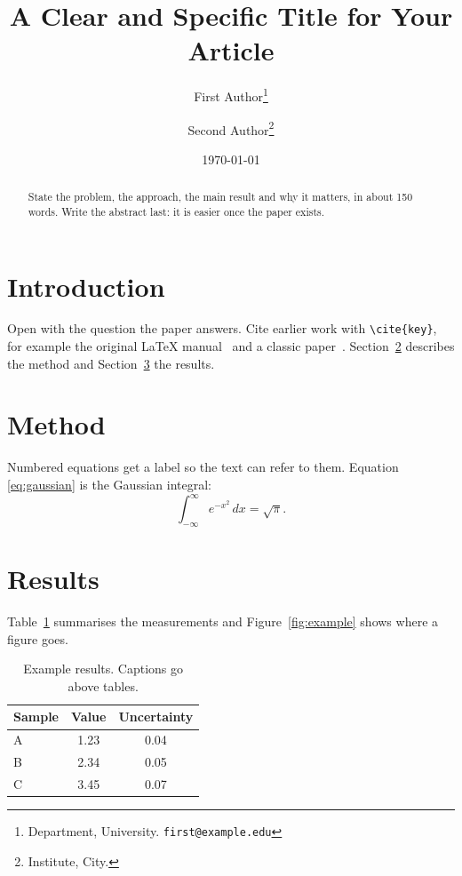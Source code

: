 \documentclass[11pt,a4paper]{article}
\title{A Clear and Specific Title for Your Article}
\author{First Author\thanks{Department, University. \texttt{first@example.edu}}
  \and Second Author\thanks{Institute, City.}}
\date{\today}
\begin{document}
\maketitle

\begin{abstract}
State the problem, the approach, the main result and why it matters, in
about 150 words. Write the abstract last: it is easier once the paper exists.
\end{abstract}

\section{Introduction}
\label{sec:intro}

Open with the question the paper answers. Cite earlier work with
\verb|\cite{key}|, for example the original \LaTeX{} manual~\cite{lamport1994}
and a classic paper~\cite{einstein1905}. Section~\ref{sec:method} describes
the method and Section~\ref{sec:results} the results.

\section{Method}
\label{sec:method}

Numbered equations get a label so the text can refer to them. Equation
\eqref{eq:gaussian} is the Gaussian integral:
\begin{equation}
  \int_{-\infty}^{\infty} e^{-x^{2}}\,dx = \sqrt{\pi}.
  \label{eq:gaussian}
\end{equation}

\section{Results}
\label{sec:results}

Table~\ref{tab:results} summarises the measurements and
Figure~\ref{fig:example} shows where a figure goes.

\begin{table}[htbp]
  \centering
  \caption{Example results. Captions go above tables.}
  \label{tab:results}
  \begin{tabular}{lcc}
    \toprule
    Sample & Value & Uncertainty \\
    \midrule
    A & 1.23 & 0.04 \\
    B & 2.34 & 0.05 \\
    C & 3.45 & 0.07 \\
    \bottomrule
  \end{tabular}
\end{table}
\end{document}
